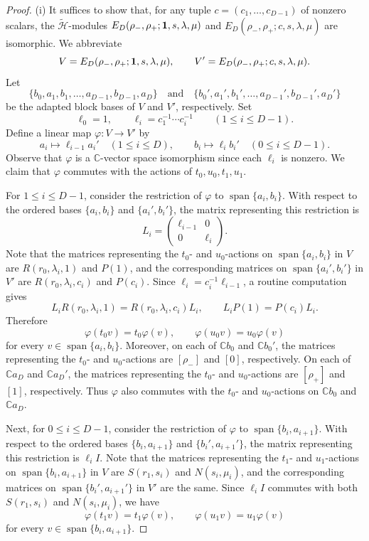 \documentclass[reqno]{amsart}
\theoremstyle{definition}
\begin{document}
\begin{proof}
%
(i)
It suffices to show that, for any tuple
$c=(c_1,\dots,c_{D-1})$ of nonzero scalars, the
$\widetilde{\mathcal{H}}$-modules
$E_D(\rho_-,\rho_+;{\bf 1},s,\lambda,\mu)$ and
$E_D(\rho_-,\rho_+;c,s,\lambda,\mu)$
are isomorphic.
We abbreviate
$$
V=E_D(\rho_-,\rho_+;{\bf 1},s,\lambda,\mu),
\qquad
V'=E_D(\rho_-,\rho_+;c,s,\lambda,\mu).
$$
Let
$$
\{b_0,a_1,b_1,\dots,a_{D-1},b_{D-1},a_D\}
\quad \text{and} \quad
\{b_0',a_1',b_1',\dots,a_{D-1}',b_{D-1}',a_D'\}
$$
be the adapted block bases of $V$ and $V'$, respectively.
Set
$$
\ell_0=1,
\qquad
\ell_i=c_1^{-1}\cdots c_i^{-1}
\qquad (1\leq i\leq D-1).
$$
Define a linear map
$\varphi:V\to V'$
by
$$
a_i\mapsto \ell_{i-1}a_i'
\quad (1\leq i\leq D),
\qquad
b_i\mapsto \ell_i b_i'
\quad (0\leq i\leq D-1).
$$
Observe that $\varphi$ is a $\mathbb{C}$-vector space isomorphism
since each $\ell_i$ is nonzero.
We claim that $\varphi$ commutes with the actions of
$t_0,u_0,t_1,u_1$.

For $1\leq i\leq D-1$, consider the restriction of $\varphi$ to
$\operatorname{span}\{a_i,b_i\}$.
With respect to the ordered bases $\{a_i,b_i\}$ and $\{a_i',b_i'\}$,
the matrix representing this restriction is
$$
L_i=
\begin{pmatrix}
\ell_{i-1}&0\\
0&\ell_i
\end{pmatrix}.
$$
Note that the matrices representing the $t_0$- and $u_0$-actions on
$\operatorname{span}\{a_i,b_i\}$ in $V$ are
$R(r_0,\lambda_i,1)$ and $P(1)$, and the corresponding matrices on
$\operatorname{span}\{a_i',b_i'\}$ in $V'$ are
$R(r_0,\lambda_i,c_i)$ and $P(c_i)$.
Since $\ell_i=c_i^{-1}\ell_{i-1}$, a routine computation gives
$$
L_iR(r_0,\lambda_i,1)=R(r_0,\lambda_i,c_i)L_i,
\qquad
L_iP(1)=P(c_i)L_i.
$$
Therefore
$$
\varphi(t_0v)=t_0\varphi(v),
\qquad
\varphi(u_0v)=u_0\varphi(v)
$$
for every $v\in\operatorname{span}\{a_i,b_i\}$.
Moreover, on each of $\mathbb{C}b_0$ and $\mathbb{C}b_0'$, the matrices
representing the $t_0$- and $u_0$-actions are $[\rho_-]$ and $[0]$,
respectively.
On each of $\mathbb{C}a_D$ and $\mathbb{C}a_D'$, the matrices
representing the $t_0$- and $u_0$-actions are $[\rho_+]$ and $[1]$, 
respectively.
Thus $\varphi$ also commutes with the $t_0$- and $u_0$-actions on
$\mathbb{C}b_0$ and $\mathbb{C}a_D$.

Next, for $0\leq i\leq D-1$, consider the restriction of $\varphi$
to $\operatorname{span}\{b_i,a_{i+1}\}$.
With respect to the ordered bases $\{b_i,a_{i+1}\}$ and
$\{b_i',a_{i+1}'\}$, the matrix representing this restriction is
$\ell_iI$.
Note that the matrices representing the $t_1$- and $u_1$-actions on
$\operatorname{span}\{b_i,a_{i+1}\}$ in $V$ are
$S(r_1,s_i)$ and $N(s_i,\mu_i)$, and the corresponding matrices on
$\operatorname{span}\{b_i',a_{i+1}'\}$ in $V'$ are the same.
Since $\ell_iI$ commutes with both $S(r_1,s_i)$ and $N(s_i,\mu_i)$, we have
$$
\varphi(t_1v)=t_1\varphi(v),
\qquad
\varphi(u_1v)=u_1\varphi(v)
$$
for every $v\in\operatorname{span}\{b_i,a_{i+1}\}$.


\end{proof}
\end{document}
